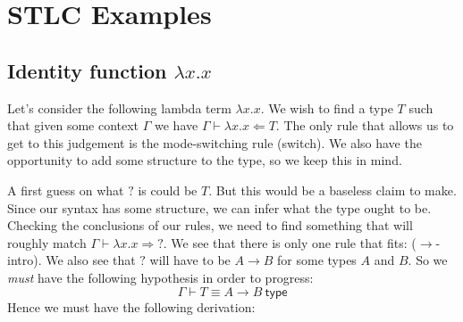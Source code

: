 \section{STLC Examples}

\subsection{Identity function \texorpdfstring{$\lambda x . x$}{}}

\begin{example}\label{identity}
    Let's consider the following lambda term $\lambda x . x$. We wish to find a type $T$ such that given some context $\Gamma$ we have $\Gamma \vdash \lambda x . x \Leftarrow T$. The only rule that allows us to get to this judgement is the mode-switching rule (switch). We also have the opportunity to add some structure to the type, so we keep this in mind.
    \begin{prooftree}
    \end{prooftree}
    
    A first guess on what $\boxed{?}$ is could be $T$. But this would be a baseless claim to make. Since our syntax has some structure, we can infer what the type ought to be. Checking the conclusions of our rules, we need to find something that will roughly match $\Gamma \vdash \lambda x . x \Rightarrow \boxed{?}$. We see that there is only one rule that fits: ($\to$-intro). We also see that $\boxed{?}$ will have to be $A \to B$ for some types $A$ and $B$. So we \emph{must} have the following hypothesis in order to progress:
    \begin{equation*}
        \Gamma \vdash T \equiv A \to B\ \mathsf{type} \tag{$*$}
    \end{equation*}
     Hence we must have the following derivation:
     
     \begin{prooftree}
     \end{prooftree}
     

\end{example}
